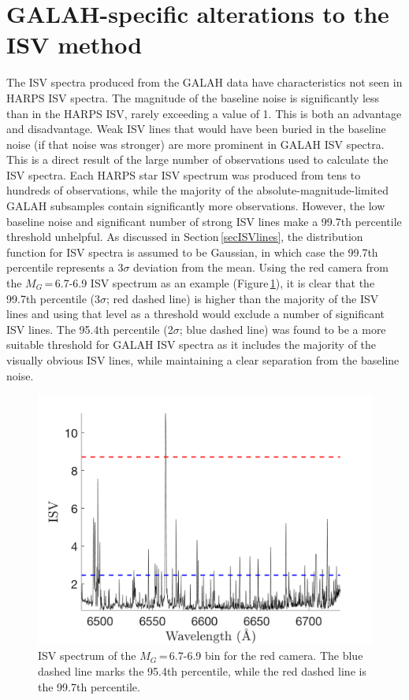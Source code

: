 \section{GALAH-specific alterations to the ISV method}
\label{secGALAHalteration}
The ISV spectra produced from the GALAH data have characteristics not seen in HARPS ISV spectra. The magnitude of the baseline noise is significantly less than in the HARPS ISV, rarely exceeding a value of 1. This is both an advantage and disadvantage. Weak ISV lines that would have been buried in the baseline noise (if that noise was stronger) are more prominent in GALAH ISV spectra. This is a direct result of the large number of observations used to calculate the ISV spectra. Each HARPS star ISV spectrum was produced from tens to hundreds of observations, while the majority of the absolute-magnitude-limited GALAH subsamples contain significantly more observations. However, the low baseline noise and significant number of strong ISV lines make a 99.7th percentile threshold unhelpful. As discussed in Section\,\ref{secISVlines}, the distribution function for ISV spectra is assumed to be Gaussian, in which case the 99.7th percentile represents a 3$\sigma$ deviation from the mean. Using the red camera from the $M_G$\,=\,6.7-6.9 ISV spectrum as an example (Figure\,\ref{figGALAH_threshold_sigma}), it is clear that the 99.7th percentile (3$\sigma$; red dashed line) is higher than the majority of the ISV lines and using that level as a threshold would exclude a number of significant ISV lines. The 95.4th percentile (2$\sigma$; blue dashed line) was found to be a more suitable threshold for GALAH ISV spectra as it includes the majority of the visually obvious ISV lines, while maintaining a clear separation from the baseline noise.\\

\begin{figure}
    \centering
    \includegraphics[width=.8\textwidth]{GALAHthresholdsigma.png}
    \caption{ISV spectrum of the $M_G$\,=\,6.7-6.9 bin for the red camera. The blue dashed line marks the 95.4th percentile, while the red dashed line is the 99.7th percentile.}
    \label{figGALAH_threshold_sigma}
\end{figure}

